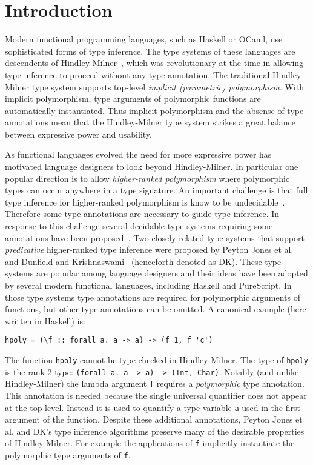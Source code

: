 \section{Introduction}

Modern functional programming languages, such as Haskell or OCaml,
use sophisticated forms of type inference. The type systems of these languages are
descendents of Hindley-Milner~\cite{}, which was revolutionary at the
time in allowing type-inference to proceed without any type
annotation. The traditional Hindley-Milner type system supports
top-level \emph{implicit (parametric) polymorphism}. With implicit
polymorphism, type arguments of polymorphic functions are
automatically instantiated. Thus implicit polymorphism and the absense of
type annotations mean that the Hindley-Milner type system 
strikes a great balance between expressive power and usability. 

As functional languages evolved the need for more expressive
power has motivated language designers to look beyond Hindley-Milner.
In particular one popular direction is to allow 
\emph{higher-ranked polymorphism} where polymorphic types can
occur anywhere in a type signature.  
An important challenge is that full type inference for higher-ranked
polymorphism is know to be undecidable~\cite{}. Therefore some type
annotations are necessary to guide type inference. In response to this 
challenge several decidable type systems requiring some annotations 
have been proposed~\cite{}.
Two closely related type systems that 
support \emph{predicative} higher-ranked type inference were proposed 
by Peyton Jones et al.~\cite{} and Dunfield and
Krishnaswami~\cite{} (henceforth denoted as DK). 
These type systems are
popular among language designers and their ideas have been adopted by
several modern functional languages, including Haskell and PureScript.
In those type systems
type annotations are required for polymorphic arguments of functions,
but other type annotations can be omitted. A canonical example (here written in Haskell) is:
\begin{verbatim}
hpoly = (\f :: forall a. a -> a) -> (f 1, f 'c')
\end{verbatim}
The function \verb|hpoly| cannot be
type-checked in Hindley-Milner.  The type of \verb|hpoly| is the rank-2 type:
\verb|(forall a. a -> a) -> (Int, Char)|. Notably (and unlike
Hindley-Milner) the lambda argument \verb|f| requires a
\emph{polymorphic} type annotation.
This annotation is needed because the single universal quantifier
does not appear at the top-level. Instead it is used to quantify a
type variable \verb|a| used in the first argument of the
function. 
Despite these additional annotations, Peyton Jones et al. and DK's
type inference algorithms preserve many of the desirable properties 
of Hindley-Milner. For example the applications of \verb|f| implicitly 
instantiate the polymorphic type arguments of \verb|f|.

